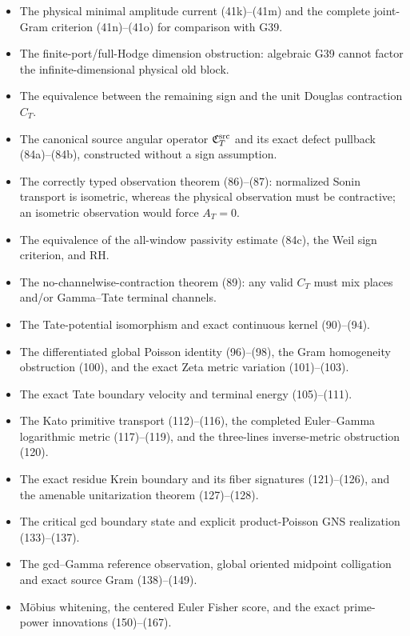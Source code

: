 \documentclass[11pt]{article}
\begin{document}
\begin{itemize}
      not required for, physical continuum old compatibility.
\item The physical minimal amplitude current (41k)--(41m) and the complete
      joint-Gram criterion (41n)--(41o) for comparison with G39.
\item The finite-port/full-Hodge dimension obstruction: algebraic G39 cannot
      factor the infinite-dimensional physical old block.
\item The equivalence between the remaining sign and the unit Douglas
      contraction $C_T$.
\item The canonical source angular operator
      $\mathfrak C_T^{\rm src}$ and its exact defect pullback
      (84a)--(84b), constructed without a sign assumption.
\item The correctly typed observation theorem (86)--(87): normalized Sonin
      transport is isometric, whereas the physical observation must be
      contractive; an isometric observation would force $A_T=0$.
\item The equivalence of the all-window passivity estimate (84c), the Weil
      sign criterion, and RH.
\item The no-channelwise-contraction theorem (89): any valid $C_T$ must mix
      places and/or Gamma--Tate terminal channels.
\item The Tate-potential isomorphism and exact continuous kernel
      (90)--(94).
\item The differentiated global Poisson identity (96)--(98), the Gram
      homogeneity obstruction (100), and the exact Zeta metric variation
      (101)--(103).
\item The exact Tate boundary velocity and terminal energy (105)--(111).
\item The Kato primitive transport (112)--(116), the completed
      Euler--Gamma logarithmic metric (117)--(119), and the three-lines
      inverse-metric obstruction (120).
\item The exact residue Krein boundary and its fiber signatures
      (121)--(126), and the amenable unitarization theorem (127)--(128).
\item The critical gcd boundary state and explicit product-Poisson GNS
      realization (133)--(137).
\item The gcd--Gamma reference observation, global oriented midpoint
      colligation and exact source Gram (138)--(149).
\item M\"obius whitening, the centered Euler Fisher score, and the exact
      prime-power innovations (150)--(167).

\end{itemize}
\end{document}
